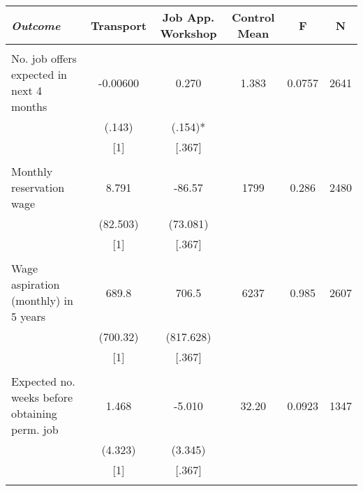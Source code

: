 \begin{tabular}{lccccc} \hline
\multicolumn{1}{l}{\emph{Outcome}} & \multicolumn{1}{c}{Transport} &\multicolumn{1}{c}{Job App. Workshop} & \multicolumn{1}{c}{Control Mean} & \multicolumn{1}{c}{F} & \multicolumn{1}{c}{N} \\ \hline \\
No. job offers expected in next 4 months & -0.00600 & 0.270 & 1.383 & 0.0757 & 2641 \\
& (.143) & (.154)* &  &  &  \\
& [1] & [.367] &  &  &  \\
&  &  &  &  &  \\
Monthly reservation wage & 8.791 & -86.57 & 1799 & 0.286 & 2480 \\
& (82.503) & (73.081) &  &  &  \\
& [1] & [.367] &  &  &  \\
&  &  &  &  &  \\
Wage aspiration (monthly) in 5 years & 689.8 & 706.5 & 6237 & 0.985 & 2607 \\
& (700.32) & (817.628) &  &  &  \\
& [1] & [.367] &  &  &  \\
&  &  &  &  &  \\
Expected no. weeks before obtaining perm. job & 1.468 & -5.010 & 32.20 & 0.0923 & 1347 \\
& (4.323) & (3.345) &  &  &  \\
& [1] & [.367] &  &  &  \\
&  &  &  &  &  \\ \hline
\end{tabular}
